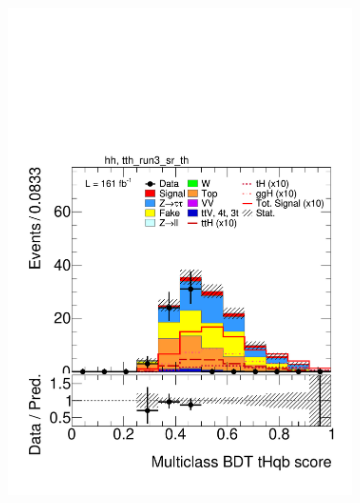 \begin{figure}[htbp]
  \centering
  \begin{subfigure}[b]{0.49\textwidth}
    \centering
    \includegraphics[width=\textwidth]{images/plots_modelling_run2_run3_variables/run_3_tth/plot_tth_th_multiclass_th_hh_tth_run3_sr_th_22_23_24.pdf}
    \caption{}


\end{subfigure}
\end{figure}
